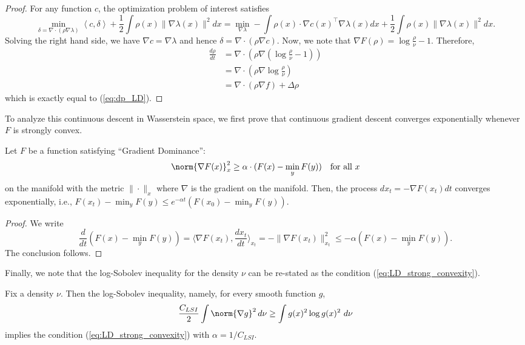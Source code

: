 \begin{proof}
For any function $c$, the optimization problem of interest satisfies
\[
\min_{\delta=\nabla\cdot(\rho\nabla\lambda)}\left\langle c,\delta\right\rangle +\frac{1}{2}\int\rho(x)\|\nabla\lambda(x)\|^{2}dx=\min_{\nabla\lambda}-\int\rho(x)\cdot\nabla c(x)^{\top}\nabla\lambda(x)dx+\frac{1}{2}\int\rho(x)\|\nabla\lambda(x)\|^{2}dx.
\]
Solving the right hand side, we have $\nabla c=\nabla\lambda$ and
hence $\delta=\nabla\cdot(\rho\nabla c)$. Now, we note that $\nabla F(\rho)=\log\frac{\rho}{\nu}-1$.
Therefore, 
\begin{align*}
\frac{d\rho}{dt} & =\nabla\cdot(\rho\nabla(\log\frac{\rho}{\nu}-1))\\
 & =\nabla\cdot(\rho\nabla\log\frac{\rho}{\nu})\\
 & =\nabla\cdot\left(\rho\nabla f\right)+\Delta\rho
\end{align*}
which is exactly equal to (\ref{eq:dp_LD}). 
\end{proof}
To analyze this continuous descent in Wasserstein space, we first
prove that continuous gradient descent converges exponentially whenever
$F$ is strongly convex.
\begin{lem}
\label{lem:grad-dom}Let $F$ be a function satisfying ``Gradient
Dominance'':
\begin{equation}
\norm{\nabla F(x)}_{x}^{2}\ge\alpha\cdot(F(x)-\min_{y}F(y))\quad\text{for all }x\label{eq:LD_strong_convexity}
\end{equation}
on the manifold with the metric $\|\cdot\|_{x}$ where $\nabla$ is
the gradient on the manifold. Then, the process $dx_{t}=-\nabla F(x_{t})dt$
converges exponentially, i.e., $F(x_{t})-\min_{y}F(y)\le e^{-\alpha t}(F(x_{0})-\min_{y}F(y))$.
\end{lem}

\begin{proof}
We write
\[
\frac{d}{dt}(F(x)-\min_{y}F(y))=\langle\nabla F(x_{t}),\frac{dx_{t}}{dt}\rangle_{x_{t}}=-\|\nabla F(x_{t})\|_{x_{t}}^{2}\leq-\alpha(F(x)-\min_{y}F(y)).
\]
The conclusion follows.
\end{proof}
Finally, we note that the log-Sobolev inequality for the density $\nu$
can be re-stated as the condition (\ref{eq:LD_strong_convexity}).
\begin{lem}
\label{lem:log_sob_LD}Fix a density $\nu$. Then the log-Sobolev
inequality, namely, for every smooth function $g$, 
\[
\frac{C_{LSI}}{2}\int\norm{\nabla g}^{2}\,d\nu\ge\int g(x)^{2}\log g(x)^{2}\ d\nu
\]
 implies the condition (\ref{eq:LD_strong_convexity}) with $\alpha=1/C_{LSI}$.
\end{lem}

